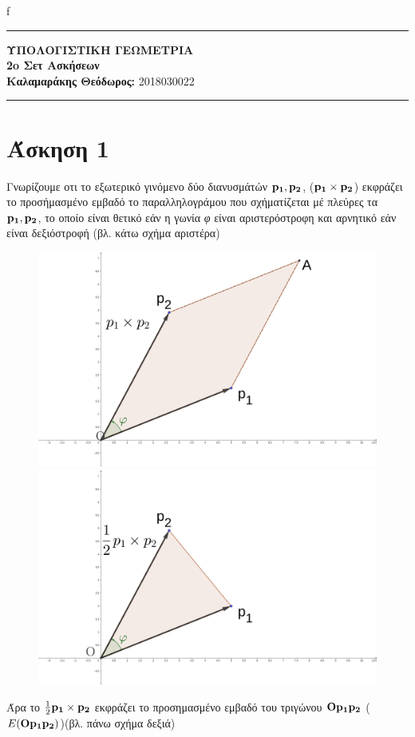 f\documentclass[12pt]{article}
\begin{document}
\greektext

\noindent\rule{\textwidth}{2pt}
\begin{center}
{\bf ΥΠΟΛΟΓΙΣΤΙΚΗ ΓΕΩΜΕΤΡΙΑ}\\ 
{\bf 2o Σετ Ασκήσεων }\\
{\bf Καλαμαράκης Θεόδωρος:} 2018030022\\
\end{center}
\rule{\textwidth}{.5pt}
\noindent

\begin{center}

\end{center}
 
 

\justifying

\section*{Άσκηση 1}

Γνωρίζουμε οτι το εξωτερικό γινόμενο δύο διανυσμάτών $\bf p_1,p_2$, ($\bf p_1 \times p_2$) εκφράζει το προσήμασμένο εμβαδό το παραλληλογράμου που σχήματίζεται μέ πλεύρες τα $\bf p_1, p_2$, το οποίο είναι θετικό εάν η 
γωνία {\it φ} είναι αριστερόστροφη και αρνητικό εάν είναι δεξιόστροφή (βλ. κάτω σχήμα αριστέρα)
\begin{figure}[H]

    \centering
    \includegraphics[scale = 0.6]{geogebra-export.png}
    \includegraphics[scale =0.6]{geogebra-export1.png}
\end{figure}
Άρα το $\frac{1}{2}\bf p_1 \times p_2$ εκφράζει το προσημασμένο εμβαδό του τριγώνου $\bf Op_1p_2$ ($E(\bf Op_1p_2)$)(βλ. πάνω σχήμα δεξιά)\\
\end{document}
